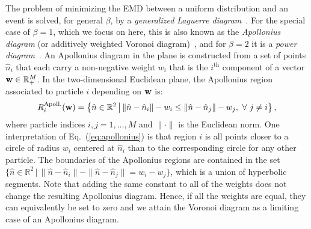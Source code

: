 \documentclass[letterpaper,11pt]{article}
\DeclareRobustCommand{\Eq}[1]{Eq.~(\ref{#1})}
\begin{document}
The problem of minimizing the EMD between a uniform distribution and an event is solved, for general $\beta$, by a \emph{generalized Laguerre diagram}~\cite{bourne2018semi}.
%
For the special case of $\beta=1$, which we focus on here, this is also known as the \emph{Apollonius diagram} (or additively weighted Voronoi diagram)~\cite{DBLP:conf/esa/KaravelasY02,DBLP:journals/comgeo/GeissKPR13,hartmann2017semi}, and for $\beta=2$ it is a \emph{power diagram}~\cite{DBLP:journals/tog/XinLCCYTW16}.
%
An Apollonius diagram in the plane is constructed from a set of points $\hat n_i$ that each carry a non-negative weight $w_i$ that is the $i^\text{th}$ component of a vector ${\bf w}\in\mathbb{R}_+^M$.
%
In the two-dimensional Euclidean plane, the Apollonius region associated to particle $i$ depending on ${\bf w}$ is:
%
\begin{equation}
\label{eq:apollonius}
R^\text{Apoll.}_i({\bf w})=\left\{\hat n\in\mathbb{R}^2\,\big|\,\|\hat n-\hat n_i\|-w_i\le\|\hat n-\hat n_j\|-w_j,\,\,\forall\,\,j\neq i\right\},
\end{equation}
where particle indices $i,j=1,\ldots,M$ and $\|\cdot\|$ is the Euclidean norm.
%
One interpretation of \Eq{eq:apollonius} is that region $i$ is all points closer to a circle of radius $w_i$ centered at $\hat n_i$ than to the corresponding circle for any other particle.
%
The boundaries of the Apollonius regions are contained in the set $\{\hat n\in\mathbb{R}^2\,|\,\|\hat n-\hat n_i\|-\|\hat n-\hat n_j\|=w_i-w_j\}$, which is a union of hyperbolic segments.
%
Note that adding the same constant to all of the weights does not change the resulting Apollonius diagram.
%
Hence, if all the weights are equal, they can equivalently be set to zero and we attain the Voronoi diagram as a limiting case of an Apollonius diagram.
\end{document}
